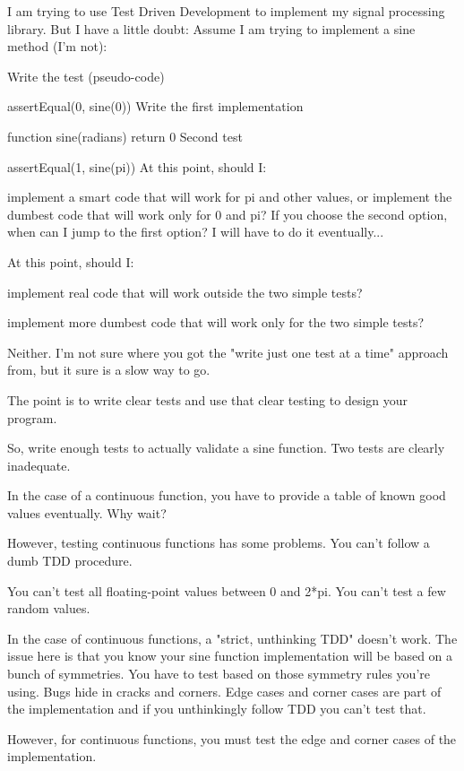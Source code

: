 \label{Testing_Notes}
I am trying to use Test Driven Development to implement my signal processing library. But I have a little doubt: Assume I am trying to implement a sine method (I'm not):

Write the test (pseudo-code)

assertEqual(0, sine(0))
Write the first implementation

function sine(radians)
    return 0
    Second test

    assertEqual(1, sine(pi))
    At this point, should I:

    implement a smart code that will work for pi and other values, or
    implement the dumbest code that will work only for 0 and pi?
    If you choose the second option, when can I jump to the first option? I will have to do it eventually...

    At this point, should I:

    implement real code that will work outside the two simple tests?

    implement more dumbest code that will work only for the two simple tests?

    Neither. I'm not sure where you got the "write just one test at a time" approach from, but it sure is a slow way to go.

    The point is to write clear tests and use that clear testing to design your program.

    So, write enough tests to actually validate a sine function. Two tests are clearly inadequate.

    In the case of a continuous function, you have to provide a table of known good values eventually. Why wait?

    However, testing continuous functions has some problems. You can't follow a dumb TDD procedure.

    You can't test all floating-point values between 0 and 2*pi. You can't test a few random values.

    In the case of continuous functions, a "strict, unthinking TDD" doesn't work. The issue here is that you know your sine function implementation will be based on a bunch of symmetries. You have to test based on those symmetry rules you're using. Bugs hide in cracks and corners. Edge cases and corner cases are part of the implementation and if you unthinkingly follow TDD you can't test that.

    However, for continuous functions, you must test the edge and corner cases of the implementation.

